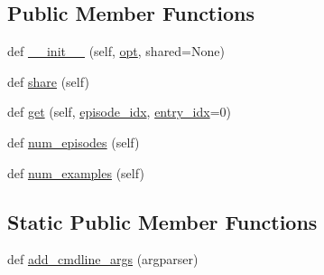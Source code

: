 \subsection*{Public Member Functions}
\begin{DoxyCompactItemize}
\item 
def \hyperlink{classparlai_1_1tasks_1_1talkthewalk_1_1base_1_1TTWBase_abde7fa2ca98467601795e5873285d8a0}{\+\_\+\+\_\+init\+\_\+\+\_\+} (self, \hyperlink{classparlai_1_1tasks_1_1talkthewalk_1_1base_1_1TTWBase_aa716b1fde5dd6d0409ff111df962067e}{opt}, shared=None)
\item 
def \hyperlink{classparlai_1_1tasks_1_1talkthewalk_1_1base_1_1TTWBase_ac8cfd853c90d3dbc0ee6ada6dbc23726}{share} (self)
\item 
def \hyperlink{classparlai_1_1tasks_1_1talkthewalk_1_1base_1_1TTWBase_adda57628371cdbb1afef6f297dab7c54}{get} (self, \hyperlink{classparlai_1_1core_1_1teachers_1_1FixedDialogTeacher_afd4ebab8063eb42d182d30a1a41f133e}{episode\+\_\+idx}, \hyperlink{classparlai_1_1core_1_1teachers_1_1FixedDialogTeacher_ae3201b15f3c3b46a2f3511bad9b43e7d}{entry\+\_\+idx}=0)
\item 
def \hyperlink{classparlai_1_1tasks_1_1talkthewalk_1_1base_1_1TTWBase_ab4890c4569ff31724718ed8c684e1a76}{num\+\_\+episodes} (self)
\item 
def \hyperlink{classparlai_1_1tasks_1_1talkthewalk_1_1base_1_1TTWBase_a691d7f4a22c6ea032489ea70fe5d6b35}{num\+\_\+examples} (self)
\end{DoxyCompactItemize}
\subsection*{Static Public Member Functions}
\begin{DoxyCompactItemize}
\item 
def \hyperlink{classparlai_1_1tasks_1_1talkthewalk_1_1base_1_1TTWBase_a58e285e5ba5843219867ad14512bde8a}{add\+\_\+cmdline\+\_\+args} (argparser)
\end{DoxyCompactItemize}
